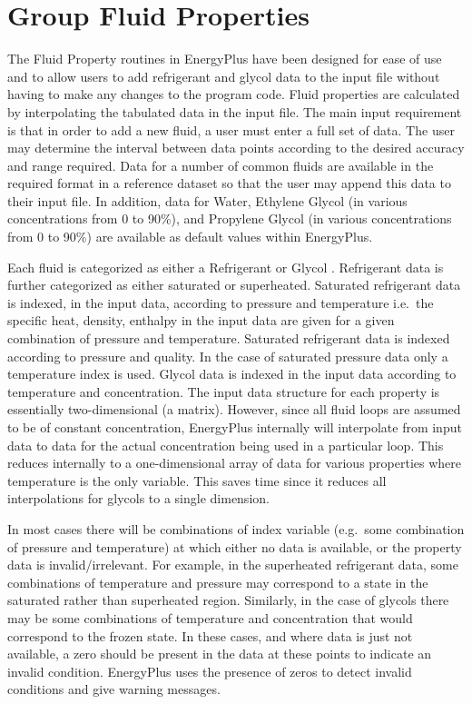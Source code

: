 \section{Group Fluid Properties}\label{group-fluid-properties}

The Fluid Property routines in EnergyPlus have been designed for ease of use and to allow users to add refrigerant and glycol data to the input file without having to make any changes to the program code. Fluid properties are calculated by interpolating the tabulated data in the input file. The main input requirement is that in order to add a new fluid, a user must enter a full set of data. The user may determine the interval between data points according to the desired accuracy and range required. Data for a number of common fluids are available in the required format in a reference dataset so that the user may append this data to their input file. In addition, data for Water, Ethylene Glycol (in various concentrations from 0 to 90\%), and Propylene Glycol (in various concentrations from 0 to 90\%) are available as default values within EnergyPlus.

Each fluid is categorized as either a Refrigerant or Glycol . Refrigerant data is further categorized as either saturated or superheated. Saturated refrigerant data is indexed, in the input data, according to pressure and temperature i.e.~the specific heat, density, enthalpy in the input data are given for a given combination of pressure and temperature. Saturated refrigerant data is indexed according to pressure and quality. In the case of saturated pressure data only a temperature index is used. Glycol data is indexed in the input data according to temperature and concentration. The input data structure for each property is essentially two-dimensional (a matrix). However, since all fluid loops are assumed to be of constant concentration, EnergyPlus internally will interpolate from input data to data for the actual concentration being used in a particular loop. This reduces internally to a one-dimensional array of data for various properties where temperature is the only variable. This saves time since it reduces all interpolations for glycols to a single dimension.

In most cases there will be combinations of index variable (e.g.~some combination of pressure and temperature) at which either no data is available, or the property data is invalid/irrelevant. For example, in the superheated refrigerant data, some combinations of temperature and pressure may correspond to a state in the saturated rather than superheated region. Similarly, in the case of glycols there may be some combinations of temperature and concentration that would correspond to the frozen state. In these cases, and where data is just not available, a zero should be present in the data at these points to indicate an invalid condition. EnergyPlus uses the presence of zeros to detect invalid conditions and give warning messages.

